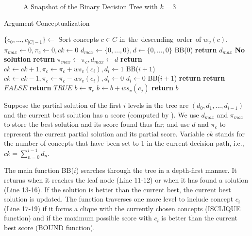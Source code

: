 \begin{figure}[th]
\centering
{}
\caption{A Snapshot of the Binary Decision Tree with $k=3$}
\label{fig:search_tree}
\end{figure}

\begin{algorithm}[th]
\small
\caption{Argument Conceptualization}
\label{al:backtrack}
\begin{algorithmic}[1]
\State $\{c_0,...,c_{|C|-1}\}\leftarrow$ Sort concepts $c\in C$ in\ the\ descending\ order\ of $w_v(c)$.
\State $\pi_{max} \leftarrow 0,\pi_{c} \leftarrow 0,ck \leftarrow 0$
\State $d_{max}\leftarrow\{0,...,0\},d\leftarrow\{0,...,0\}$
\State BB($0$)
\State \textbf{return} $d_{max}$
\Else
\State \textbf{No solution}
\EndIf
\EndFunction
\Statex
{}
\State \textbf{return}
\EndIf
{}
\State $\pi_{max} \leftarrow \pi_{c}, d_{max} \leftarrow d$
\EndIf
\State \textbf{return}
\EndIf
{}
\State $ck \leftarrow ck+1, \pi_{c} \leftarrow \pi_{c}+ws_v(c_i), d_i \leftarrow 1$
\State BB($i+1$)
\State $ck \leftarrow ck-1, \pi_{c} \leftarrow \pi_{c}-ws_v(c_i), d_i \leftarrow 0$
\EndIf
{}
\State $d_i \leftarrow 0$
\State BB($i+1$)
\EndIf
\State \textbf{return}
\EndFunction
\Statex
{}
\State \textbf{return} $FALSE$
\EndIf
\EndIf
\EndFor
\State \textbf{return} $TRUE$
\EndFunction
\Statex
{}
\State $b \leftarrow \pi_{c}$
\State $b \leftarrow b+ws_v(c_{j})$
\EndFor
\State \textbf{return} $b$
\EndFunction
\end{algorithmic}
\end{algorithm}

Suppose the partial solution of the first $i$ levels in the tree
are $(d_0, d_1, ..., d_{i-1})$ and
the current best solution has a score (computed by ).
We use $d_{max}$ and $\pi_{max}$ to store the
best solution and its score found thus far; and use $d$ and $\pi_{c}$ to
represent the current partial solution and its partial score.
Variable $ck$ stands for the number of concepts that have been set to
1 in the current decision path, i.e.,
$ck=\sum_{n=0}^{i-1}d_n.$

The main function BB($i$) searches through the tree in a depth-first manner.
It returns when it reaches the leaf node (Line 11-12) or when it has found a
solution (Line 13-16). If the solution is better than the current best,
the current best solution is updated. The function traverses one
more level to include concept $c_i$ (Line 17-19) if it forms
a clique with the currently chosen concepts (ISCLIQUE function)
and if the maximum possible score with $c_i$ is better than
the current best score (BOUND function).

